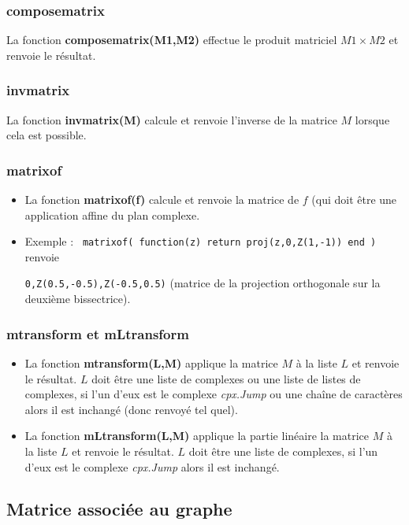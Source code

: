 \documentclass[%
10pt,%
a4paper,%
french,%
]%
{article}%
\begin{document}
\subsubsection{composematrix}
La fonction \textbf{composematrix(M1,M2)} effectue le produit matriciel $M1\times M2$ et renvoie le résultat.

\subsubsection{invmatrix}
La fonction \textbf{invmatrix(M)} calcule et renvoie l'inverse de la matrice $M$ lorsque cela est possible.

\subsubsection{matrixof}
\begin{itemize}
    \item La fonction \textbf{matrixof(f)} calcule et renvoie la matrice de $f$ (qui doit être une application affine du plan complexe.
    \item Exemple : \texttt{ matrixof( function(z) return proj(z,{0,Z(1,-1)}) end )} renvoie \par
     \texttt{{0,Z(0.5,-0.5),Z(-0.5,0.5)}} (matrice de la projection orthogonale sur la deuxième bissectrice).
\end{itemize}

\subsubsection{mtransform et mLtransform}
\begin{itemize}
    \item La fonction \textbf{mtransform(L,M)} applique la matrice $M$ à la liste $L$ et renvoie le résultat. $L$ doit être une liste de complexes ou une liste de listes de complexes, si l'un d'eux est le complexe \emph{cpx.Jump} ou une chaîne de caractères alors il est inchangé (donc renvoyé tel quel).
    \item La fonction \textbf{mLtransform(L,M)} applique la partie linéaire la matrice $M$ à la liste $L$ et renvoie le résultat. $L$ doit être une liste de complexes, si l'un d'eux est le complexe \emph{cpx.Jump} alors il est inchangé.
\end{itemize}

\subsection{Matrice associée au graphe}
\end{document}

